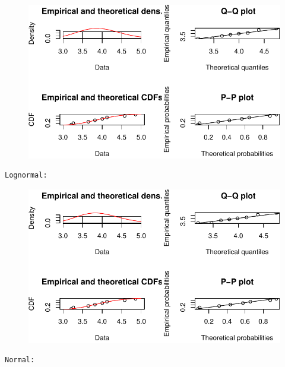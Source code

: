 \documentclass[
  letterpaper,
  DIV=11,
  numbers=noendperiod]{scrartcl}
\begin{document}
\begin{figure}[H]

{\centering \includegraphics{quiz5_files/figure-pdf/unnamed-chunk-39-3.pdf}

}

\end{figure}

\begin{verbatim}
Lognormal: 
\end{verbatim}

\begin{figure}[H]

{\centering \includegraphics{quiz5_files/figure-pdf/unnamed-chunk-39-4.pdf}

}

\end{figure}

\begin{verbatim}
Normal: 
\end{verbatim}
\end{document}
